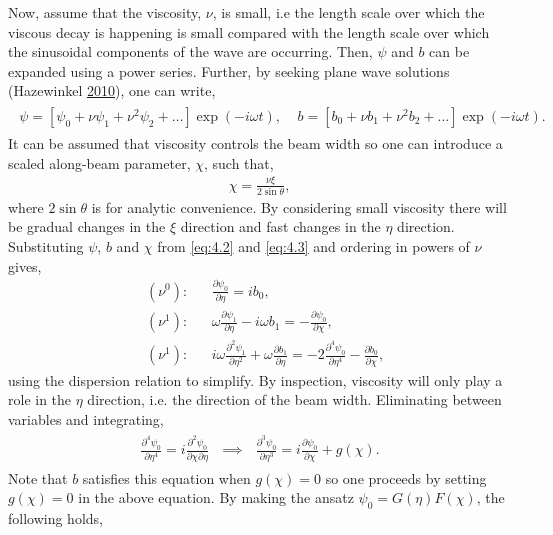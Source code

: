 \documentclass[a4paper]{article}
\numberwithin{equation}{section}
\begin{document}
Now, assume that the viscosity, $\nu$, is small, i.e the length scale over which the viscous decay is happening is small compared with the length scale over which the sinusoidal components of the wave are occurring. Then, $\psi$ and $b$ can be expanded using a power series. Further, by seeking plane wave solutions (Hazewinkel \hyperlink{ref 24}{2010}), one can write, 
\begin{align}\label{eq:4.2}
\begin{split}
\psi = [\psi_0 + \nu\psi_1 + \nu^2\psi_2 + \ldots ] \exp(-i\omega t), ~~~~~ b = [b_0 + \nu b_1 + \nu^2
b_2 + \ldots]\exp(-i\omega t).
\end{split}
\end{align}
It can be assumed that viscosity controls the beam width so one can introduce a scaled along-beam parameter, $\chi$, such that,
\begin{align}\label{eq:4.3}
\chi = \frac{\nu \xi}{2\sin\theta},
\end{align}
where $2\sin \theta$ is for analytic convenience. By considering small viscosity there will be gradual changes in the $\xi$ direction and fast changes in the $\eta$ direction. Substituting $\psi$, $b$ and $\chi$ from \eqref{eq:4.2} and \eqref{eq:4.3} and ordering in powers of $\nu$ gives, 
\begin{align*}
&(\nu^0):&&\frac{\partial \psi_0}{\partial \eta} = ib_0,\\
&(\nu^1): &&\omega \frac{\partial \psi_1}{\partial \eta} - i\omega b_1 = -\frac{\partial \psi_0}{\partial \chi}, \\
&(\nu^1): &&i \omega \frac{\partial^2 \psi_1}{\partial \eta^2} + \omega \frac{\partial b_1}{\partial \eta} = -2 \frac{\partial^4 \psi_0}{\partial \eta^4} - \frac{\partial b_0}{\partial \chi},
\end{align*}
using the dispersion relation to simplify. By inspection, viscosity will only play a role in the $\eta$ direction, i.e. the direction of the beam width. Eliminating between variables and integrating,
\begin{align*}
\begin{split}
\frac{\partial^4 \psi_0}{\partial \eta^4} = i \frac{\partial^2 \psi_0}{\partial \chi \partial \eta}~~~ \implies ~~~\frac{\partial^3 \psi_0}{\partial \eta^3} = i \frac{\partial \psi_0}{\partial \chi} + g(\chi).
\end{split}
\end{align*}
Note that $b$ satisfies this equation when $g(\chi) = 0$ so one proceeds by setting $g(\chi) = 0$ in the above equation. By making the ansatz $\psi_0 = G(\eta)F(\chi)$, the following holds,  
\end{document}
